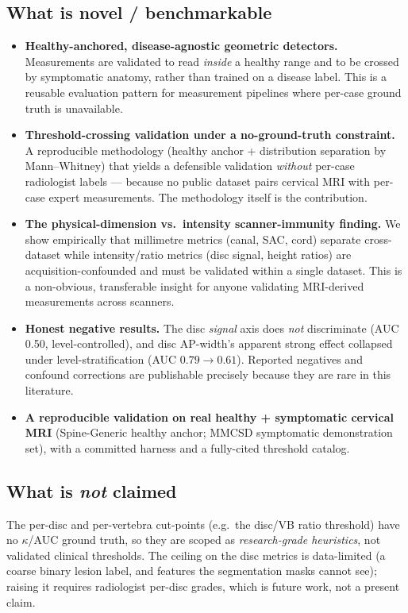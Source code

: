 \documentclass[11pt]{article}
\begin{document}
\subsection{What is novel / benchmarkable}
\begin{itemize}
  \item \textbf{Healthy-anchored, disease-agnostic geometric detectors.} Measurements are validated to
  read \emph{inside} a healthy range and to be crossed by symptomatic anatomy, rather than trained on a
  disease label. This is a reusable evaluation pattern for measurement pipelines where per-case ground
  truth is unavailable.
  \item \textbf{Threshold-crossing validation under a no-ground-truth constraint.} A reproducible
  methodology (healthy anchor + distribution separation by Mann--Whitney) that yields a defensible
  validation \emph{without} per-case radiologist labels --- because no public dataset pairs cervical MRI
  with per-case expert measurements. The methodology itself is the contribution.
  \item \textbf{The physical-dimension vs.\ intensity scanner-immunity finding.} We show empirically
  that millimetre metrics (canal, SAC, cord) separate cross-dataset while intensity/ratio metrics (disc
  signal, height ratios) are acquisition-confounded and must be validated within a single dataset. This
  is a non-obvious, transferable insight for anyone validating MRI-derived measurements across scanners.
  \item \textbf{Honest negative results.} The disc \emph{signal} axis does \emph{not} discriminate
  (AUC 0.50, level-controlled), and disc AP-width's apparent strong effect collapsed under
  level-stratification (AUC $0.79 \to 0.61$). Reported negatives and confound corrections are publishable
  precisely because they are rare in this literature.
  \item \textbf{A reproducible validation on real healthy + symptomatic cervical MRI} (Spine-Generic
  healthy anchor; MMCSD symptomatic demonstration set), with a committed harness and a fully-cited
  threshold catalog.
\end{itemize}

\subsection{What is \emph{not} claimed}
The per-disc and per-vertebra cut-points (e.g.\ the disc/VB ratio threshold) have no $\kappa$/AUC ground
truth, so they are scoped as \emph{research-grade heuristics}, not validated clinical thresholds. The
ceiling on the disc metrics is data-limited (a coarse binary lesion label, and features the segmentation
masks cannot see); raising it requires radiologist per-disc grades, which is future work, not a present
claim.
\end{document}
